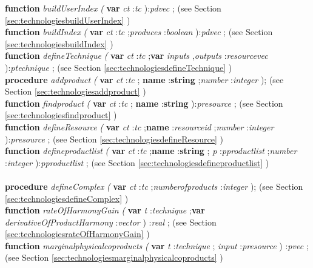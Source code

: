 \begin{tabbing}
\<\textsf{\textbf{function}  \textit{buildUserIndex} \textit{(} \textbf{var}  \textit{ct} :\textit{tc} ):\textit{pdvec}  ;} (see Section \ref{sec:technologiesbuildUserIndex} )\\
\<\textsf{\textbf{function}  \textit{buildIndex} \textit{(} \textbf{var}  \textit{ct} :\textit{tc} ;\textit{produces} :\textit{boolean} ):\textit{pdvec}  ;} (see Section \ref{sec:technologiesbuildIndex} )\\
\<\textsf{\textbf{function}  \textit{defineTechnique} \textit{(} \textbf{var}  \textit{ct} :\textit{tc} ;\textbf{var}  \textit{inputs} ,\textit{outputs} :\textit{resourcevec}  ):\textit{ptechnique} ;} (see Section \ref{sec:technologiesdefineTechnique} )\\
\<\textsf{\textbf{procedure}  \textit{addproduct} \textit{(} \textbf{var}  \textit{ct} :\textit{tc} ;  \textbf{name} :\textbf{string} ;\textit{number} :\textit{integer} );} (see Section \ref{sec:technologiesaddproduct} )\\
\<\textsf{\textbf{function}  \textit{findproduct} \textit{(} \textbf{var}  \textit{ct} :\textit{tc} ; \textbf{name} :\textbf{string} ):\textit{presource} ;} (see Section \ref{sec:technologiesfindproduct} )\\
\<\textsf{\textbf{function}  \textit{defineResource} \textit{(} \textbf{var}  \textit{ct} :\textit{tc} ;\textbf{name} :\textit{resourceid} ;\textit{number} :\textit{integer} ):\textit{presource} ;} (see Section \ref{sec:technologiesdefineResource} )\\
\<\textsf{\textbf{function}  \textit{defineproductlist} \textit{(} \textbf{var}  \textit{ct} :\textit{tc} ;\textbf{name} :\textbf{string} ; \textit{p} :\textit{pproductlist} ;\textit{number} :\textit{integer} ):\textit{pproductlist} ;} (see Section \ref{sec:technologiesdefineproductlist} )\\
\\
\<\textsf{\textbf{procedure}  \textit{defineComplex} \textit{(} \textbf{var}  \textit{ct} :\textit{tc} ;\textit{numberofproducts} :\textit{integer} );} (see Section \ref{sec:technologiesdefineComplex} )\\
\<\textsf{\textbf{function}  \textit{rateOfHarmonyGain} \textit{(} \textbf{var}  \textit{t} :\textit{technique} ;\textbf{var}  \textit{derivativeOfProductHarmony} :\textit{vector} ) :\textit{real}  ;} (see Section \ref{sec:technologiesrateOfHarmonyGain} )\\
\<\textsf{\textbf{function}   \textit{marginalphysicalcoproducts} \textit{(} \textbf{var}  \textit{t} :\textit{technique} ;   \textit{input} :\textit{presource} ) :\textit{pvec} ;} (see Section \ref{sec:technologiesmarginalphysicalcoproducts} )\\

\end{tabbing}
